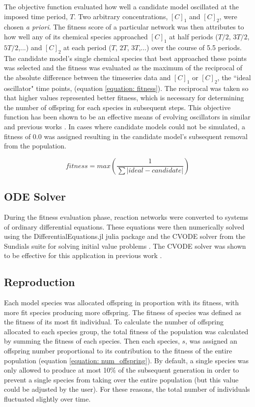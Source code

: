 \documentclass[12pt]{report}
\begin{document}
The objective function evaluated how well a candidate model oscillated at the imposed time period, $T$.  Two arbitrary concentrations, $[C]_{1}$ and $[C]_{2}$,  were chosen \textit{a priori}. The fitness score of a particular network was then attributes to how well any of its chemical species approached $[C]_{1}$ at half periods ($T/2$, $3T/2$, $5T/2$,...) and  $[C]_{2}$ at each period ($T$, $2T$, $3T$,...) over the course of 5.5 periods. The candidate model's single chemical species that best approached these points was selected and the fitness was evaluated as the maximum of the reciprocal of the absolute difference between the timeseries data and $[C]_{1}$ or $[C]_{2}$, the ``ideal oscillator" time points, (equation \ref{equation: fitness}). The reciprocal was taken so that higher values represented better fitness, which is necessary for determining the number of offspring for each species in subsequent steps. This objective function has been shown to be an effective means of evolving oscillators in similar and previous works \cite{Paladugu2006, francois_hakim_2004, Tatka2023}. In cases where candidate models could not be simulated, a fitness of 0.0 was assigned resulting in the candidate model's subsequent removal from the population.

\begin{equation}
\label{equation: fitness}
fitness = max(\frac{1}{\sum|ideal - candidate|})
\end{equation}

\subsection{ODE Solver}
During the fitness evaluation phase, reaction networks were converted to systems of ordinary differential equations. These equations were then numerically solved using the DifferentialEquations.jl julia package \cite{DifferentialEquations.jl-2017} and the CVODE solver from the Sundials suite for solving initial value problems \cite{hindmarsh2005sundials}. The CVODE solver was shown to be effective for this application in previous work \cite{Tatka2023}.

\subsection{Reproduction}

Each model species was allocated offspring in proportion with its fitness, with more fit species producing more offspring. The fitness of species was defined as the fitness of its most fit individual. To calculate the number of offspring allocated to each species group, the total fitness of the population was calculated by summing the fitness of each species. Then each species, $s$, was assigned an offspring number proportional to its contribution to the fitness of the entire population (equation \ref{equation: num_offspring}). By default, a single species was only allowed to produce at most 10\% of the subsequent generation in order to prevent a single species from taking over the entire population (but this value could be adjusted by the user). For these reasons, the total number of individuals fluctuated slightly over time.
\end{document}
